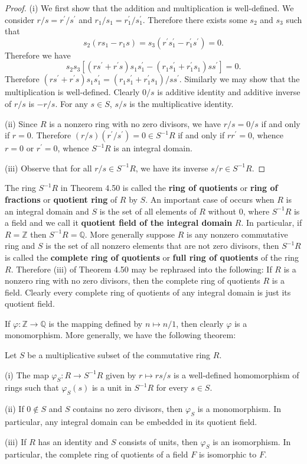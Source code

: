 \begin{proof}
(i) We first show that the addition and multiplication is well-defined. We consider $r/s=r^\prime/s^\prime$ and $r_1/s_1=r_1^\prime/s_1^\prime$. Therefore there exists some $s_2$ and $s_3$ such that 
$$
s_2\left( rs_1-r_1s \right) =s_3\left( r^{\prime}s_{1}^{\prime}-r_{1}^{\prime}s^{\prime} \right) =0.
$$
Therefore we have 
$$
s_2s_3\left[ \left( rs^{\prime}+r^{\prime}s \right) s_1s_{1}^{\prime}-\left( r_1s_{1}^{\prime}+r_{1}^{\prime}s_1 \right) ss^{\prime} \right] =0.
$$
Therefore $(rs^\prime+r^\prime s)s_1s_1^\prime=(r_1s_1^\prime+r_1^\prime s_1)/ss^\prime$. Similarly we may show that the multiplication is well-defined. Clearly $0/s$ is additive identity and additive inverse of $r/s$ is $-r/s$. For any $s\in S$, $s/s$ is the multiplicative identity.\par
(ii) Since $R$ is a nonzero ring with no zero divisors, we have $r/s=0/s$ if and only if $r=0$. Therefore $(r/s)(r^\prime/s^\prime)=0\in S^{-1}R$ if and only if $rr^\prime=0$, whence $r=0$ or $r^\prime=0$, whence $S^{-1}R$ is an integral domain.\par
(iii) Observe that for all $r/s\in S^{-1}R$, we have its inverse $s/r\in S^{-1}R$.
\end{proof}
The ring $S^{-1}R$ in Theorem 4.50 is called the \textbf{ring of quotients} or \textbf{ring of fractions} or \textbf{quotient ring} of $R$ by $S$. An important case of occurs when $R$ is an integral domain and $S$ is the set of all elements of $R$ without $0$, where $S^{-1}R$ is a field and we call it \textbf{quotient field of the integral domain} $R$. In particular, if $R=\mathbb{Z}$ then $S^{-1}R=\mathbb{Q}$. More generally suppose $R$ is any nonzero commutative ring and $S$ is the set of all nonzero elements that are not zero divisors, then $S^{-1}R$ is called the \textbf{complete ring of quotients} or \textbf{full ring of quotients} of the ring $R$. Therefore (iii) of Theorem 4.50 may be rephrased into the following: If $R$ is a nonzero ring with no zero divisors, then the complete ring of quotients $R$ is a field. Clearly every complete ring of quotients of any integral domain is just its quotient field.\par
If $\varphi:\mathbb{Z}\to\mathbb{Q}$ is the mapping defined by $n\mapsto n/1$, then clearly $\varphi$ is a monomorphism. More generally, we have the following theorem:
\begin{theorem}
Let $S$ be a multiplicative subset of the commutative ring $R$.\par
(i) The map $\varphi_S:R\to S^{-1}R$ given by $r\mapsto rs/s$ is a well-defined homomorphism of rings such that $\varphi_S(s)$ is a unit in $S^{-1}R$ for every $s\in S$.\par
(ii) If $0\notin S$ and $S$ contains no zero divisors, then $\varphi_S$ is a monomorphism. In particular, any integral domain can be embedded in its quotient field.\par
(iii) If $R$ has an identity and $S$ consists of units, then $\varphi_S$ is an isomorphism. In particular, the complete ring of quotients of a field $F$ is isomorphic to $F$.
\end{theorem}

